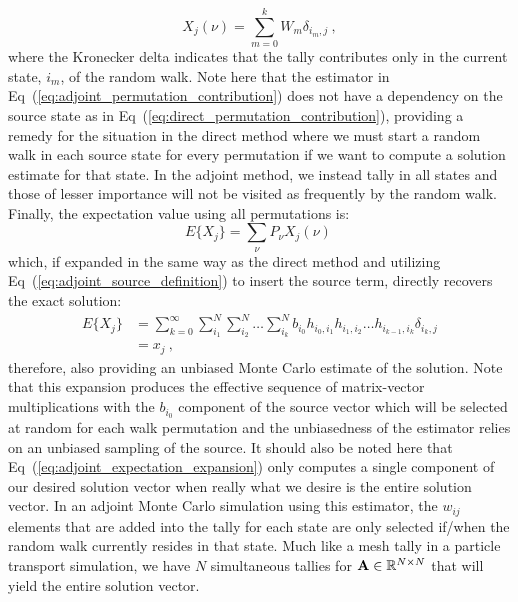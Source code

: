 \begin{equation}
  X_{j}(\nu) = \sum_{m=0}^k W_{m} \delta_{i_m,j}\:,
  \label{eq:adjoint_permutation_contribution}
\end{equation}
where the Kronecker delta indicates that the tally contributes only in
the current state, $i_m$, of the random walk.  Note here that the
estimator in Eq~(\ref{eq:adjoint_permutation_contribution}) does not
have a dependency on the source state as in
Eq~(\ref{eq:direct_permutation_contribution}), providing a remedy for
the situation in the direct method where we must start a random walk
in each source state for every permutation if we want to compute a
solution estimate for that state. In the adjoint method, we instead
tally in all states and those of lesser importance will not be visited
as frequently by the random walk. Finally, the expectation value using
all permutations is:
\begin{equation}
  E\{X_j\} = \sum_{\nu} P_{\nu} X_{j}(\nu)\:
  \label{eq:adjoint_expectation_value}
\end{equation}
which, if expanded in the same way as the direct method and utilizing
Eq~(\ref{eq:adjoint_source_definition}) to insert the source term,
directly recovers the exact solution:
\begin{equation}
  \begin{split}
    E\{X_j\} &=\sum_{k=0}^{\infty}\sum_{i_1}^{N}\sum_{i_2}^{N}\ldots
    \sum_{i_k}^{N} b_{i_0} h_{i_0,i_1}h_{i_1,i_2}\ldots
    h_{i_{k-1},i_k} \delta_{i_k,j} \\ &= x_{j}\:,
  \end{split}
  \label{eq:adjoint_expectation_expansion}
\end{equation}
therefore, also providing an unbiased Monte Carlo estimate of the
solution. Note that this expansion produces the effective sequence of
matrix-vector multiplications with the $b_{i_0}$ component of the
source vector which will be selected at random for each walk
permutation and the unbiasedness of the estimator relies on an
unbiased sampling of the source. It should also be noted here that
Eq~(\ref{eq:adjoint_expectation_expansion}) only computes a single
component of our desired solution vector when really what we desire is
the entire solution vector. In an adjoint Monte Carlo simulation using
this estimator, the $w_{ij}$ elements that are added into the tally
for each state are only selected if/when the random walk currently
resides in that state. Much like a mesh tally in a particle transport
simulation, we have $N$ simultaneous tallies for $\mathbf{A} \in
\mathbb{R}^{N \times N}$ that will yield the entire solution
vector.


